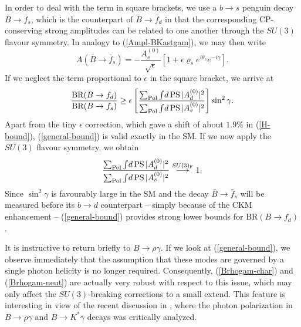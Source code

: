 \documentclass[11pt]{cernrep}
\begin{document}
In order to deal with the term in square brackets, we use a $b\to s$ 
penguin decay $\bar B \to \bar f_s$, which is the counterpart of $\bar B \to \bar f_d$ 
in that the corresponding CP-conserving strong amplitudes can be related
to one another through the $SU(3)$ flavour symmetry. In analogy to 
(\ref{Ampl-BKastgam}), we may then write
\begin{equation}
A(\bar B \to \bar f_s)= - \frac{A^{(0)}_s}{\sqrt{\epsilon}}
\left[1+\epsilon\varrho_s e^{i\theta_s}e^{-i\gamma}\right].
\end{equation}
If we neglect the term proportional to $\epsilon$ in the square bracket, 
we arrive at
\begin{equation}\label{general-bound}
\frac{\mbox{BR}(B \to f_d)}{\mbox{BR}(B \to f_s)}
\geq \epsilon \left[\frac{\sum_{\rm Pol}\int \! d \, {\rm PS} \, 
|A^{(0)}_d|^2 }{\sum_{\rm Pol}\int \! d \, {\rm PS} \, |A^{(0)}_s|^2 }
\right]\sin^2\gamma.
\end{equation}
Apart from the tiny $\epsilon$ correction, which gave a shift of about
$1.9\%$ in (\ref{H-bound}), (\ref{general-bound}) is valid
exactly in the SM. If we now apply the $SU(3)$ flavour symmetry, we obtain
\begin{equation}\label{SU3-limit}
\frac{\sum_{\rm Pol}\int \! d \, {\rm PS} \, 
|A^{(0)}_d|^2 }{\sum_{\rm Pol}\int \! d \, {\rm PS} \, |A^{(0)}_s|^2 }
\stackrel{SU(3)_{\rm F}}{\longrightarrow} 1.
\end{equation}
Since $\sin^2\gamma$ is favourably large in the SM and the decay
$\bar B \to \bar f_s$ will be measured before its $b\to d$ 
counterpart  -- simply because of the CKM enhancement -- 
(\ref{general-bound}) provides strong lower bounds for 
$\mbox{BR}(B \to f_d)$. 

It is instructive to return briefly to $B\to\rho\gamma$. If we look at 
(\ref{general-bound}), we observe immediately that the assumption that 
these modes are governed by a single photon helicity is no longer 
required. Consequently, (\ref{Brhogam-char}) and (\ref{Brhogam-neut}) 
are actually very robust with respect to this issue, which may only affect 
the $SU(3)$-breaking corrections to a small extend. This feature is interesting
in view of the recent discussion in \cite{GGLP}, where the photon polarization
in $B\to \rho\gamma$ and $B\to K^\ast \gamma$ decays was critically analyzed. 
\end{document}
